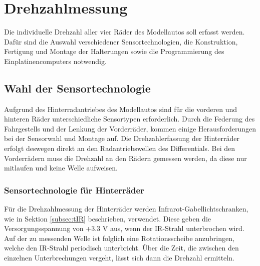\section{Drehzahlmessung}
\label{sec:RPM}
Die individuelle Drehzahl aller vier Räder des Modellautos soll erfasst werden. Dafür sind die Auswahl verschiedener Sensortechnologien, die Konstruktion, Fertigung und Montage der Halterungen sowie die Programmierung des Einplatinencomputers notwendig.

\subsection{Wahl der Sensortechnologie}
\label{subsec:RPMchoice}
Aufgrund des Hinterradantriebes des Modellautos sind für die vorderen und hinteren Räder unterschiedliche Sensortypen erforderlich. Durch die Federung des Fahrgestells und der Lenkung der Vorderräder, kommen einige Herausforderungen bei der Sensorwahl und Montage auf. Die Drehzahlerfassung der Hinterräder erfolgt deswegen direkt an den Radantriebswellen des Differentials. Bei den Vorderrädern muss die Drehzahl an den Rädern gemessen werden, da diese nur mitlaufen und keine Welle aufweisen.

\subsubsection{Sensortechnologie für Hinterräder}
\label{subsubsec:RPMchoiceRear}
Für die Drehzahlmessung der Hinterräder werden Infrarot-Gabellichtschranken, wie in Sektion \ref{subsec:tIR} beschrieben, verwendet. Diese geben die Versorgungsspannung von +3.3 V aus, wenn der \ac{IR}-Strahl unterbrochen wird. Auf der zu messenden Welle ist folglich eine Rotationsscheibe anzubringen, welche den \ac{IR}-Strahl periodisch unterbricht. Über die Zeit, die zwischen den einzelnen Unterbrechungen vergeht, lässt sich dann die Drehzahl ermitteln.

